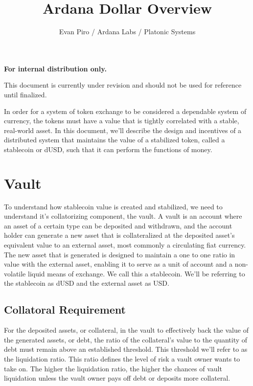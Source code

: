 \documentclass[12pt]{article}
\title{Ardana Dollar Overview}
\author{Evan Piro / Ardana Labs / Platonic Systems}
\begin{document}
\maketitle

\begin{center}
	\textbf{For internal distribution only.}
\end{center}

\begin{center}
	\color{red} This document is currently under revision and should not be used for reference until finalized.
\end{center}

In order for a system of token exchange to be considered a dependable system of currency, the tokens must have a value that is tightly correlated with a stable, real-world asset. In this document, we'll describe the design and incentives of a distributed system that maintains the value of a stabilized token, called a stablecoin or dUSD, such that it can perform the functions of money.

\section{Vault}

To understand how stablecoin value is created and stabilized, we need to understand it's collatorizing component, the vault. A vault is an account where an asset of a certain type can be deposited and withdrawn, and the account holder can generate a new asset that is collateralized at the deposited asset's equivalent value to an external asset, most commonly a circulating fiat currency. The new asset that is generated is designed to maintain a one to one ratio in value with the external asset, enabling it to serve as a unit of account and a non-volatile liquid means of exchange. We call this a stablecoin. We'll be referring to the stablecoin as dUSD and the external asset as USD.

\subsection{Collatoral Requirement}

For the deposited assets, or collateral, in the vault to effectively back the value of the generated assets, or debt, the ratio of the collateral's value to the quantity of debt must remain above an established threshold. This threshold we'll refer to as the liquidation ratio. This ratio defines the level of risk a vault owner wants to take on. The higher the liquidation ratio, the higher the chances of vault liquidation unless the vault owner pays off debt or deposits more collateral.
\end{document}

